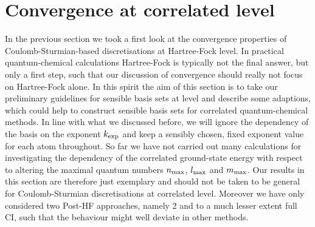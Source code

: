 \section{Convergence at correlated level}


In the previous section we took a first look at the convergence
properties of Coulomb-Sturmian-based discretisations at Hartree-Fock level.
In practical quantum-chemical calculations Hartree-Fock is typically
not the final answer,
but only a first step,
such that our discussion of convergence should really not focus on Hartree-Fock alone.
In this spirit the aim of this section is to take our preliminary guidelines
for sensible basis sets at \HF level and describe some adaptions,
which could help to construct sensible \CS basis sets for correlated
quantum-chemical methods.
In line with what we discussed before, we will ignore the dependency
of the \CS basis on the exponent $k_\text{exp}$ and keep a sensibly chosen,
fixed exponent value for each atom throughout.
So far we have not carried out many calculations
for investigating the dependency of the correlated ground-state energy
with respect to altering the maximal quantum numbers $n_\text{max}$, $l_\text{max}$ and $m_\text{max}$.
Our results in this section are therefore just exemplary
and should not be taken to be general for Coulomb-Sturmian discretisations
at correlated level.
Moreover we have only considered two Post-HF approaches,
namely {\MP}2 and to a much lesser extent full CI,
such that the behaviour might well deviate in other methods.

